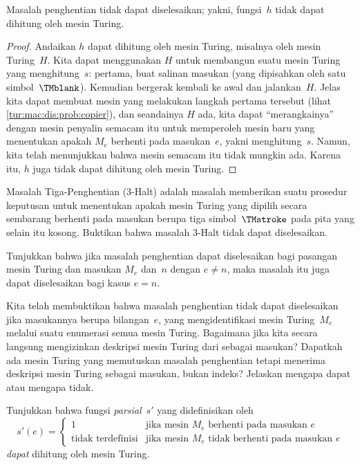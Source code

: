 \documentclass[../../../include/open-logic-section]{subfiles}
\begin{document}
\begin{thm}
 Masalah penghentian tidak dapat diselesaikan;
yakni, fungsi~$h$ tidak dapat dihitung oleh mesin Turing.
\end{thm}

\begin{proof}
Andaikan $h$ dapat dihitung oleh mesin Turing, misalnya oleh mesin Turing~$H$.
Kita dapat menggunakan $H$ untuk membangun suatu mesin Turing yang
menghitung~$s$: pertama, buat salinan masukan (yang dipisahkan oleh satu
simbol~$\TMblank$). Kemudian bergerak kembali ke awal dan jalankan~$H$. Jelas
kita dapat membuat mesin yang melakukan langkah pertama tersebut (lihat
\cref{tur:mac:dis:prob:copier}), dan seandainya $H$ ada, kita dapat
``merangkainya'' dengan mesin penyalin semacam itu untuk memperoleh mesin baru
yang menentukan apakah $M_e$ berhenti pada masukan~$e$, yakni menghitung~$s$.
Namun, kita telah menunjukkan bahwa mesin semacam itu tidak mungkin ada.
Karena itu, $h$ juga tidak dapat dihitung oleh mesin Turing.
\end{proof}

\begin{prob}
Masalah Tiga-Penghentian (3-Halt) adalah masalah memberikan suatu prosedur
keputusan untuk menentukan apakah mesin Turing yang dipilih secara sembarang
berhenti pada masukan berupa tiga simbol~$\TMstroke$ pada pita yang selain itu
kosong. Buktikan bahwa masalah 3-Halt tidak dapat diselesaikan.
\end{prob}

\begin{prob}
Tunjukkan bahwa jika masalah penghentian dapat diselesaikan bagi pasangan mesin
Turing dan masukan $M_e$ dan~$n$ dengan $e \neq n$, maka masalah itu juga dapat
diselesaikan bagi kasus $e = n$.
\end{prob}

\begin{prob}
Kita telah membuktikan bahwa masalah penghentian tidak dapat diselesaikan jika
masukannya berupa bilangan~$e$, yang mengidentifikasi mesin Turing~$M_e$
melalui suatu enumerasi semua mesin Turing. Bagaimana jika kita secara langsung
mengizinkan deskripsi mesin Turing dari  sebagai
masukan? Dapatkah ada mesin Turing yang memutuskan masalah penghentian tetapi
menerima deskripsi mesin Turing sebagai masukan, bukan indeks? Jelaskan mengapa
dapat atau mengapa tidak.
\end{prob}

\begin{prob} Tunjukkan bahwa fungsi \emph{parsial}~$s'$ yang didefinisikan oleh
  \[
  s'(e) =
  \begin{cases}
    \text{1} & \text{jika mesin~$M_e$ berhenti pada masukan $e$}\\
    \text{tidak terdefinisi} & \text{jika mesin~$M_e$ tidak berhenti pada masukan $e$}
  \end{cases}
  \]
  \emph{dapat} dihitung oleh mesin Turing.
\end{prob}
\end{document}
